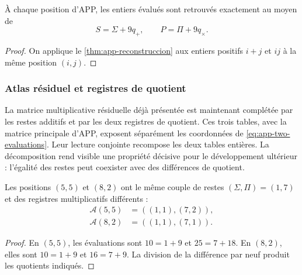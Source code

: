 \begin{bloqueindivisible}
\begin{corolario}
\label{cor:app-evaluaciones-restituidas}
À chaque position d'APP, les entiers évalués sont retrouvés exactement au moyen de
\begin{equation}
 S=\Sigma+9q_+,
 \qquad P=\Pi+9q_\times.
 \label{eq:app-s-p-lift}
\end{equation}
\end{corolario}

\begin{proof}
On applique le \cref{thm:app-reconstruccion} aux entiers positifs $i+j$ et $ij$ à la même position $(i,j)$.
\end{proof}
\end{bloqueindivisible}

\subsubsection{Atlas résiduel et registres de quotient}

La matrice multiplicative résiduelle déjà présentée est maintenant complétée par les restes additifs et par les deux registres de quotient. Ces trois tables, avec la matrice principale d'APP, exposent séparément les coordonnées de \eqref{eq:app-two-evaluations}. Leur lecture conjointe recompose les deux tables entières. La décomposition rend visible une propriété décisive pour le développement ultérieur : l'égalité des restes peut coexister avec des différences de quotient.





\begin{bloqueindivisible}
\begin{proposicion}
\label{prop:app-centro}
Les positions $(5,5)$ et $(8,2)$ ont le même couple de restes $(\Sigma,\Pi)=(1,7)$ et des registres multiplicatifs différents :
\begin{align}
 \mathcal A(5,5)&=((1,1),(7,2)),\\
 \mathcal A(8,2)&=((1,1),(7,1)).
\end{align}
\end{proposicion}

\begin{proof}
En $(5,5)$, les évaluations sont $10=1+9$ et $25=7+18$. En $(8,2)$, elles sont $10=1+9$ et $16=7+9$. La division de la différence par neuf produit les quotients indiqués.
\end{proof}
\end{bloqueindivisible}

